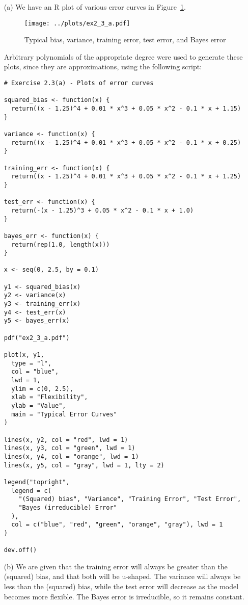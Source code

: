 
\begin{itemize}
    \item[(a)] We have an R plot of various error curves in Figure~\ref{fig2_3err}.

    \begin{figure}[!ht]
        \texttt{[image: ../plots/ex2\_3\_a.pdf]}
        \caption{Typical bias, variance, training error, test error, and Bayes error 
            \label{fig2_3err}}
    \end{figure}
     
    Arbitrary polynomials of the appropriate degree were used to generate these 
    plots, since they are approximations, using the following script:
    \scriptsize\begin{verbatim}
# Exercise 2.3(a) - Plots of error curves

squared_bias <- function(x) {
  return((x - 1.25)^4 + 0.01 * x^3 + 0.05 * x^2 - 0.1 * x + 1.15)
}

variance <- function(x) {
  return((x - 1.25)^4 + 0.01 * x^3 + 0.05 * x^2 - 0.1 * x + 0.25)
}

training_err <- function(x) {
  return((x - 1.25)^4 + 0.01 * x^3 + 0.05 * x^2 - 0.1 * x + 1.25)
}

test_err <- function(x) {
  return(-(x - 1.25)^3 + 0.05 * x^2 - 0.1 * x + 1.0)
}

bayes_err <- function(x) {
  return(rep(1.0, length(x)))
}

x <- seq(0, 2.5, by = 0.1)

y1 <- squared_bias(x)
y2 <- variance(x)
y3 <- training_err(x)
y4 <- test_err(x)
y5 <- bayes_err(x)

pdf("ex2_3_a.pdf")

plot(x, y1,
  type = "l", 
  col = "blue", 
  lwd = 1, 
  ylim = c(0, 2.5), 
  xlab = "Flexibility",
  ylab = "Value", 
  main = "Typical Error Curves"
)

lines(x, y2, col = "red", lwd = 1)
lines(x, y3, col = "green", lwd = 1)
lines(x, y4, col = "orange", lwd = 1)
lines(x, y5, col = "gray", lwd = 1, lty = 2)

legend("topright",
  legend = c(
    "(Squared) bias", "Variance", "Training Error", "Test Error",
    "Bayes (irreducible) Error"
  ),
  col = c("blue", "red", "green", "orange", "gray"), lwd = 1
)

dev.off()

    \end{verbatim}\normalsize
  \item[(b)] We are given that the training error will always be greater than
  the (squared) bias, and that both will be u-shaped. The variance will always
  be less than the (squared) bias, while the test error will decrease as the model
  becomes more flexible. The Bayes error is irreducible, so it remains constant.
\end{itemize}
